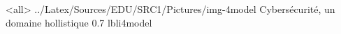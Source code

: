 \mode<all>
{\picframe
{../Latex/Sources/EDU/SRC1/Pictures/img-4model}
{Cybersécurité, un domaine hollistique}
{0.7}
{lbli4model}
}